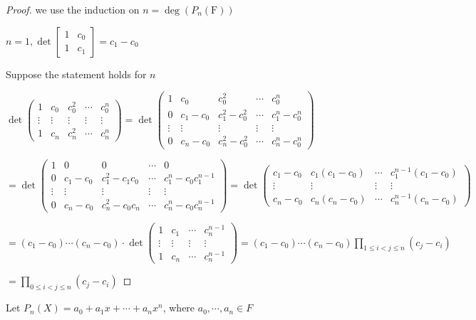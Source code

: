 \begin{proof}
	we use the induction on $n = \deg(P_n(\mathrm{F}))$
	
	$n = 1, \det\left[\begin{matrix}
		1 & c_0\\1&c_1
	\end{matrix}\right] = c_1 - c_0$
	
	Suppose the statement holds for $n$
	
	$\det \left( \begin{matrix}
		1&c_0&c_0^2&\cdots&c_0^n\\
		\vdots&\vdots&\vdots&\vdots&\vdots\\
		1&c_n&c_n^2&\cdots&c_n^n
	\end{matrix}\right) = \det \left(\begin{matrix}
		1&c_0&c_0^2&\cdots&c_0^n\\
		0&c_1-c_0&c_1^2-c_0^2&\cdots&c_1^n - c_0^n\\
		\vdots&\vdots&\vdots&\vdots&\vdots\\
		0&c_n-c_0&c_n^2-c_0^2&\cdots&c_n^n-c^n_0
	\end{matrix}\right)$
	
	$=\det \left( \begin{matrix}
		1&0&0&\cdots&0\\
		0&c_1-c_0&c_1^2-c_1c_0&\cdots&c_1^n-c_0c_1^{n-1}\\
		\vdots&\vdots&\vdots&\vdots&\vdots\\
		0&c_n-c_0&c_n^2-c_0c_n&\cdots&c_n^n-c_0c_n^{n-1}
	\end{matrix}\right) = \det\left(\begin{matrix}
		c_1-c_0&c_1(c_1-c_0)&\cdots&c_1^{n-1}(c_1-c_0)\\
		\vdots&\vdots&\vdots&\vdots\\
		c_n-c_0&c_n(c_n-c_0)&\cdots&c_n^{n-1}(c_n-c_0)
	\end{matrix}\right)$
	
	$=(c_1-c_0)\cdots(c_n - c_0)\cdot \det\left(\begin{matrix}
		1 & c_1&\cdots&c_n^{n-1}\\
		\vdots&\vdots&\vdots&\vdots\\
		1&c_n&\cdots&c_n^{n-1}
	\end{matrix}\right) = (c_1-c_0)\cdots (c_n - c_0)\prod_{1\leq i <j \leq n}(c_j-c_i)$
	
	$= \prod_{0 \leq i < j \leq n}(c_j-c_i)$
\end{proof}

Let $P_n(X) = a_0+a_1x+\cdots+a_nx^n$, where $a_0,\cdots,a_n \in F$

